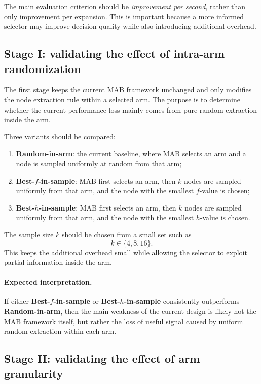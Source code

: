 \documentclass[lettersize,journal]{IEEEtran}
\begin{document}
The main evaluation criterion should be \emph{improvement per second}, rather than only improvement per expansion. This is important because a more informed selector may improve decision quality while also introducing additional overhead.

\subsection{Stage I: validating the effect of intra-arm randomization}
\label{subsec:stage1_intra_arm}

The first stage keeps the current MAB framework unchanged and only modifies the node extraction rule within a selected arm. The purpose is to determine whether the current performance loss mainly comes from pure random extraction inside the arm.

Three variants should be compared:
\begin{enumerate}[(1)]
    \item \textbf{Random-in-arm}: the current baseline, where MAB selects an arm and a node is sampled uniformly at random from that arm;
    \item \textbf{Best-$f$-in-sample}: MAB first selects an arm, then $k$ nodes are sampled uniformly from that arm, and the node with the smallest $f$-value is chosen;
    \item \textbf{Best-$h$-in-sample}: MAB first selects an arm, then $k$ nodes are sampled uniformly from that arm, and the node with the smallest $h$-value is chosen.
\end{enumerate}

The sample size $k$ should be chosen from a small set such as
\[
k \in \{4, 8, 16\}.
\]
This keeps the additional overhead small while allowing the selector to exploit partial information inside the arm.

\paragraph{Expected interpretation.}
If either \textbf{Best-$f$-in-sample} or \textbf{Best-$h$-in-sample} consistently outperforms \textbf{Random-in-arm}, then the main weakness of the current design is likely not the MAB framework itself, but rather the loss of useful signal caused by uniform random extraction within each arm.

\subsection{Stage II: validating the effect of arm granularity}
\label{subsec:stage2_arm_granularity}
\end{document}

